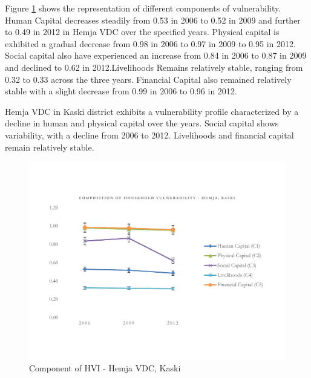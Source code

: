 Figure \ref{fig:hvihemjacomponent} shows the representation of different components of vulnerability. Human Capital decreases steadily from 0.53 in 2006 to 0.52 in 2009 and further to 0.49 in 2012 in Hemja VDC over the specified years. Physical capital is exhibited a gradual decrease from 0.98 in 2006 to 0.97 in 2009 to 0.95 in 2012. Social capital also have experienced an increase from 0.84 in 2006 to 0.87 in 2009 and declined to 0.62 in 2012.Livelihoods Remains relatively stable, ranging from 0.32 to 0.33 across the three years. Financial Capital also remained relatively stable with a slight decrease from 0.99 in 2006 to 0.96 in 2012. 

Hemja VDC in Kaski district exhibits a vulnerability profile characterized by a decline in human and physical capital over the years. Social capital shows variability, with a decline from 2006 to 2012. Livelihoods and financial capital remain relatively stable. 
\begin{figure}[ht]
	\vspace{-50pt}
	\includegraphics[scale=0.6]{figure/HVI_Component_Hemja_line.pdf}
	\vspace{-50pt} %
	\caption{Component of HVI - Hemja VDC, Kaski}
	\setlength{\abovecaptionskip}{4pt}
	\label{fig:hvihemjacomponent}
\end{figure}

